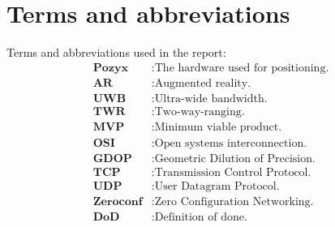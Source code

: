 \chapter*{Terms and abbreviations}
Terms and abbreviations used in the report:
\begin{align*}
    \textbf{Pozyx}    & : \text{The hardware used for positioning.} \\
    \textbf{AR}       & : \text{Augmented reality.}                 \\
    \textbf{UWB}      & : \text{Ultra-wide bandwidth.}              \\
    \textbf{TWR}      & : \text{Two-way-ranging.}                   \\
    \textbf{MVP}      & : \text{Minimum viable product.}            \\
    \textbf{OSI}      & : \text{Open systems interconnection.}      \\
    \textbf{GDOP}     & : \text{Geometric Dilution of Precision.}   \\
    \textbf{TCP}      & : \text{Transmission Control Protocol.}     \\
    \textbf{UDP}      & : \text{User Datagram Protocol.}            \\
    \textbf{Zeroconf} & : \text{Zero Configuration Networking.}     \\
    \textbf{DoD}      & : \text{Definition of done.}                \\
\end{align*}